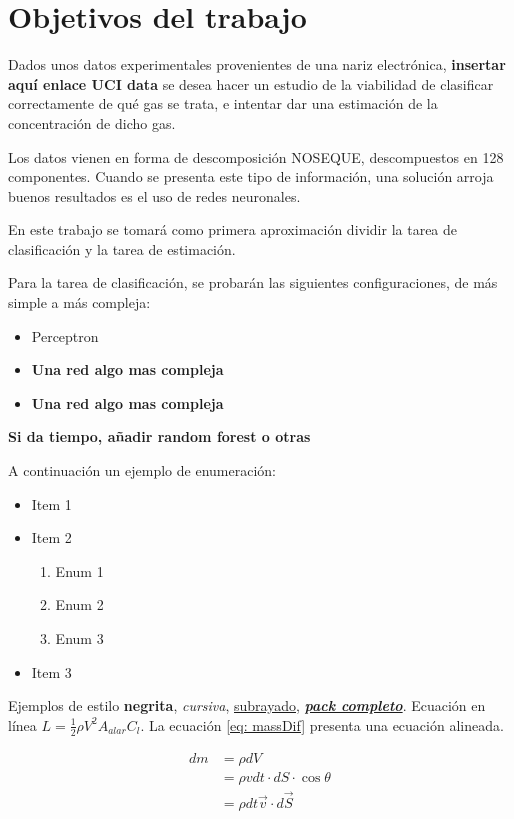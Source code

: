 \chapter{Objetivos del trabajo}

Dados unos datos experimentales provenientes de una nariz electrónica, \textbf{insertar aquí enlace UCI data} se desea hacer un estudio de la viabilidad de clasificar correctamente de qué gas se trata, e intentar dar una estimación de la concentración de dicho gas.

Los datos vienen en forma de descomposición NOSEQUE, descompuestos en 128 componentes. Cuando se presenta este tipo de información, una solución arroja buenos resultados es el uso de redes neuronales.

En este trabajo se tomará como primera aproximación dividir la tarea de clasificación y la tarea de estimación.

Para la tarea de clasificación, se probarán las siguientes configuraciones, de más simple a más compleja:

\begin{itemize}
    \item Perceptron
    \item \textbf{  Una red algo mas compleja}
    \item \textbf{  Una red algo mas compleja}
\end{itemize}

\textbf{Si da tiempo, añadir random forest o otras}

A continuación un ejemplo de enumeración:
\begin{itemize}
\item Item 1
\item Item 2
\begin{enumerate}
	\item Enum 1
	\item Enum 2
	\item Enum 3
\end{enumerate}
\item Item 3
\end{itemize}

Ejemplos de estilo \textbf{negrita}, \textit{cursiva}, \underline{subrayado}, \textbf{\textit{\underline{pack completo}}}. Ecuación en línea $L=\frac{1}{2}\rho V^2 A_{alar}C_l$. La ecuación \ref{eq: massDif} presenta una ecuación alineada.

\begin{align}
	\nonumber
	dm &= \rho dV \\ \nonumber
	   &= \rho v dt\cdot dS\cdot \cos{\theta}\\ \nonumber
	   &= \rho dt \overrightarrow{v}\cdot d\overrightarrow{S}
\end{align}\label{eq: massDif}

